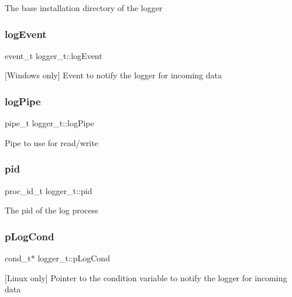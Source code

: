 The base installation directory of the logger \mbox{\label{structlogger__t_a5305675a78acc22524aff8c7351904d7}} 
\subsubsection{\texorpdfstring{log\+Event}{logEvent}}
{\footnotesize\ttfamily event\+\_\+t logger\+\_\+t\+::log\+Event}

\mbox{[}Windows only\mbox{]} Event to notify the logger for incoming data \mbox{\label{structlogger__t_a16890b7add5181dde0138ea916a8222c}} 
\subsubsection{\texorpdfstring{log\+Pipe}{logPipe}}
{\footnotesize\ttfamily pipe\+\_\+t logger\+\_\+t\+::log\+Pipe}

Pipe to use for read/write \mbox{\label{structlogger__t_a06d3329d87f49d3b73f7a805cfe5b61c}} 
\subsubsection{\texorpdfstring{pid}{pid}}
{\footnotesize\ttfamily proc\+\_\+id\+\_\+t logger\+\_\+t\+::pid}

The pid of the log process \mbox{\label{structlogger__t_a573677c90c0100b6ad3697214016caf3}} 
\subsubsection{\texorpdfstring{p\+Log\+Cond}{pLogCond}}
{\footnotesize\ttfamily cond\+\_\+t$\ast$ logger\+\_\+t\+::p\+Log\+Cond}

\mbox{[}Linux only\mbox{]} Pointer to the condition variable to notify the logger for incoming data \mbox{\label{structlogger__t_ac1af7dd39e882cfeaffb4b77e2fa4fd7}} 
